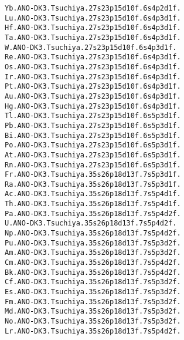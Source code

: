\begin{verbatim}
Yb.ANO-DK3.Tsuchiya.27s23p15d10f.6s4p2d1f.
Lu.ANO-DK3.Tsuchiya.27s23p15d10f.6s4p3d1f.
Hf.ANO-DK3.Tsuchiya.27s23p15d10f.6s4p3d1f.
Ta.ANO-DK3.Tsuchiya.27s23p15d10f.6s4p3d1f.
W.ANO-DK3.Tsuchiya.27s23p15d10f.6s4p3d1f.
Re.ANO-DK3.Tsuchiya.27s23p15d10f.6s4p3d1f.
Os.ANO-DK3.Tsuchiya.27s23p15d10f.6s4p3d1f.
Ir.ANO-DK3.Tsuchiya.27s23p15d10f.6s4p3d1f.
Pt.ANO-DK3.Tsuchiya.27s23p15d10f.6s4p3d1f.
Au.ANO-DK3.Tsuchiya.27s23p15d10f.6s4p3d1f.
Hg.ANO-DK3.Tsuchiya.27s23p15d10f.6s4p3d1f.
Tl.ANO-DK3.Tsuchiya.27s23p15d10f.6s5p3d1f.
Pb.ANO-DK3.Tsuchiya.27s23p15d10f.6s5p3d1f.
Bi.ANO-DK3.Tsuchiya.27s23p15d10f.6s5p3d1f.
Po.ANO-DK3.Tsuchiya.27s23p15d10f.6s5p3d1f.
At.ANO-DK3.Tsuchiya.27s23p15d10f.6s5p3d1f.
Rn.ANO-DK3.Tsuchiya.27s23p15d10f.6s5p3d1f.
Fr.ANO-DK3.Tsuchiya.35s26p18d13f.7s5p3d1f.
Ra.ANO-DK3.Tsuchiya.35s26p18d13f.7s5p3d1f.
Ac.ANO-DK3.Tsuchiya.35s26p18d13f.7s5p4d1f.
Th.ANO-DK3.Tsuchiya.35s26p18d13f.7s5p4d1f.
Pa.ANO-DK3.Tsuchiya.35s26p18d13f.7s5p4d2f.
U.ANO-DK3.Tsuchiya.35s26p18d13f.7s5p4d2f.
Np.ANO-DK3.Tsuchiya.35s26p18d13f.7s5p4d2f.
Pu.ANO-DK3.Tsuchiya.35s26p18d13f.7s5p3d2f.
Am.ANO-DK3.Tsuchiya.35s26p18d13f.7s5p3d2f.
Cm.ANO-DK3.Tsuchiya.35s26p18d13f.7s5p4d2f.
Bk.ANO-DK3.Tsuchiya.35s26p18d13f.7s5p4d2f.
Cf.ANO-DK3.Tsuchiya.35s26p18d13f.7s5p3d2f.
Es.ANO-DK3.Tsuchiya.35s26p18d13f.7s5p3d2f.
Fm.ANO-DK3.Tsuchiya.35s26p18d13f.7s5p3d2f.
Md.ANO-DK3.Tsuchiya.35s26p18d13f.7s5p3d2f.
No.ANO-DK3.Tsuchiya.35s26p18d13f.7s5p3d2f.
Lr.ANO-DK3.Tsuchiya.35s26p18d13f.7s5p4d2f.
\end{verbatim}
